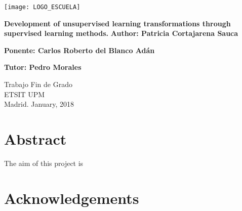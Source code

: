 \documentclass[a4paper,11pt,spanish]{report}
\newcommand{\linespacing}{1.5}
\renewcommand{\baselinestretch}{\linespacing}
\begin{document}
\raggedbottom


\thispagestyle{empty}
\begin{flushright}
\texttt{[image: LOGO\_ESCUELA]}
\end{flushright}
\vskip40mm
\begin{center}
\huge\textbf{Development of unsupervised learning transformations through supervised learning methods.}
\vskip2mm
\LARGE\textit{}
\vskip5mm
\Large\textbf{Author: Patricia Cortajarena Sauca}

\Large\textbf{Ponente: Carlos Roberto del Blanco Adán}

\Large\textbf{Tutor: Pedro Morales}

\end{center}
\vfill
\begin{flushleft}
\large
Trabajo Fin de Grado \\
ETSIT UPM 	\\
Madrid. January, 2018
\end{flushleft}

\chapter*{Abstract}
\setcounter{page}{3}

The aim of this project is  


\chapter*{Acknowledgements}

\renewcommand{\baselinestretch}{\linespacing}
\small\normalsize

\newpage
{}
\tableofcontents
\listoftables
{}
{}
\listoffigures
{}
{}
\end{document}
